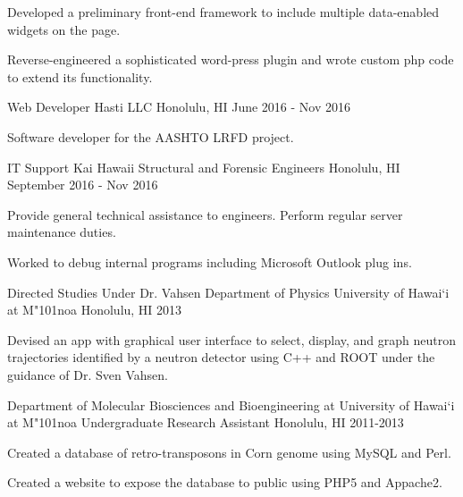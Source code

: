 \begin{cventries}
{\begin{cvitems}
			\item {Developed a preliminary front-end framework to include multiple data-enabled widgets on the page.}
			\item {Reverse-engineered a sophisticated word-press plugin and wrote custom php code to extend its functionality.}
		\end{cvitems}
	}
    \cventry
    {Web Developer}
    {Hasti LLC}
    {Honolulu, HI}
    {June 2016 - Nov 2016}
    {
        \begin{cvitems}
            \item {Software developer for the AASHTO LRFD project.}
        \end{cvitems}
    }
    \cventry
    {IT Support}
    {Kai Hawaii Structural and Forensic Engineers}
    {Honolulu, HI}
    {September 2016 - Nov 2016}
    {
	    \begin{cvitems}
		    \item{Provide general technical assistance to engineers. Perform regular server maintenance duties.}
		    \item{Worked to debug internal programs including Microsoft Outlook plug ins.}
	    \end{cvitems}	
    }
	
	\cventry
	{Directed Studies Under Dr. Vahsen}
	{Department of Physics University of Hawai`i at M{\char"101}noa}
	{Honolulu, HI}
	{2013}
	{
		\begin{cvitems}
			\item {Devised an app with graphical user interface to select, display, and graph neutron trajectories identified by a neutron detector using C++ and
				ROOT under the guidance of Dr. Sven Vahsen.}
		\end{cvitems}
	}
	\cventry
	{Department of Molecular Biosciences and Bioengineering at University of Hawai`i at M{\char"101}noa}
	{Undergraduate Research Assistant}
	{Honolulu, HI}
	{2011-2013}
	{
		\begin{cvitems}
			\item {Created a database of retro-transposons in Corn genome using MySQL and Perl.}
			\item {Created a website to expose the database to public using PHP5 and Appache2.}
		\end{cvitems}
	}
\end{cventries}

